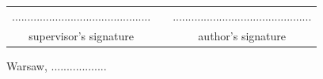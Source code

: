 \documentclass[a4paper,11pt,twoside]{report}
\theoremstyle{definition}
\newcommand{\tytul}{System zarządzania zasobami małego laboratorium chemicznego}
\renewcommand{\title}{A System for Resources Management in a Small Chemical Laboratory}
\begin{document}
\sloppy
{}




\thispagestyle{empty}\newpage
\null

\vfill

\begin{center}
\begin{tabular}[t]{ccc}
............................................. & \hspace*{100pt} & .............................................\\
supervisor's signature & \hspace*{100pt} & author's signature
\end{tabular}
\end{center}




{
\begin{abstract}

\begin{center}
\title
\end{center}

Firstly we will write an abstract of our work in English.\\

\noindent \textbf{Keywords:} keyword1, keyword2, ...
\end{abstract}
}

\null\thispagestyle{empty}\newpage


{
\begin{abstract}

\begin{center}
\tytul
\end{center}



\noindent \textbf{Słowa kluczowe:} slowo1, slowo2, ...
\end{abstract}
}




\null\thispagestyle{empty}\newpage

\null \hfill Warsaw, ..................

\par\vspace{5cm}
\end{document}
